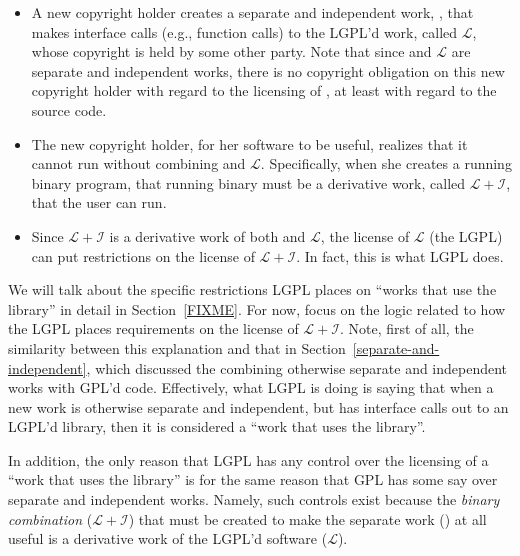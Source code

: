 \documentclass[12pt]{report}
\begin{document}
\newcommand{\workl}{$\mathcal{L}$}
\newcommand{\lplusi}{$\mathcal{L\!\!+\!\!I}$}

\begin{itemize}

\item A new copyright holder creates a separate and independent work,
  \worki{}, that makes interface calls (e.g., function calls) to the
  LGPL'd work, called \workl{}, whose copyright is held by some other
  party.  Note that since \worki{} and \workl{} are separate and
  independent works, there is no copyright obligation on this new copyright
  holder with regard to the licensing of \worki{}, at least with regard to
  the source code.

\item The new copyright holder, for her software to be useful, realizes
  that it cannot run without combining \worki{} and \workl{}.
  Specifically, when she creates a running binary program, that running
  binary must be a derivative work, called \lplusi{}, that the user can
  run.

\item Since \lplusi{} is a derivative work of both \worki{} and \workl{},
  the license of \workl{} (the LGPL) can put restrictions on the license
  of \lplusi{}.  In fact, this is what LGPL does.

\end{itemize}

We will talk about the specific restrictions LGPL places on ``works that
use the library'' in detail in Section~\ref{FIXME}.  For now, focus on the
logic related to how the LGPL places requirements on the license of
\lplusi{}.  Note, first of all, the similarity between this explanation
and that in Section~\ref{separate-and-independent}, which discussed the
combining otherwise separate and independent works with GPL'd code.
Effectively, what LGPL is doing is saying that when a new work is
otherwise separate and independent, but has interface calls out to an
LGPL'd library, then it is considered a ``work that uses the library''.

In addition, the only reason that LGPL has any control over the licensing
of a ``work that uses the library'' is for the same reason that GPL has
some say over separate and independent works.  Namely, such controls exist
because the {\em binary combination\/} (\lplusi{}) that must be created to
make the separate work (\worki{}) at all useful is a derivative work of
the LGPL'd software (\workl{}).
\end{document}
